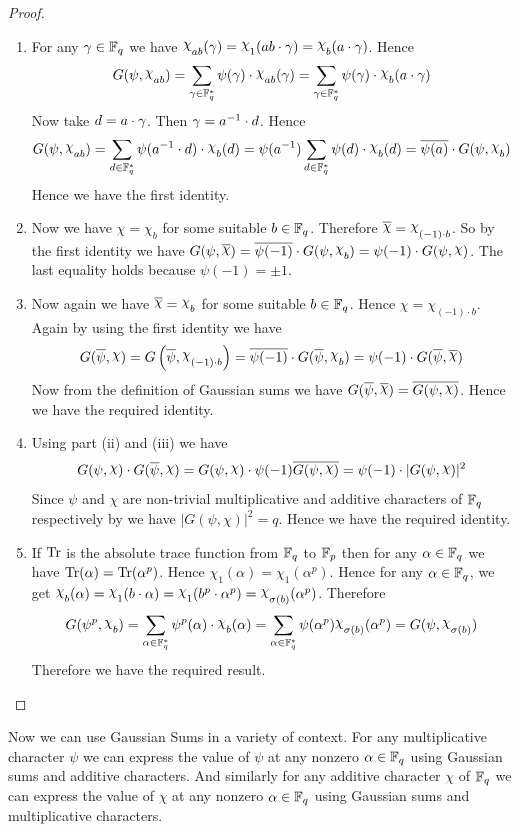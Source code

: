 \begin{proof}
  \begin{enumerate}[label=(\roman*)]
    \item For any $\gamma\in\mathbb{F}_q$ we have $\chi_{ab}(\gm)=\chi_1(ab\cdot \gm)=\chi_b(a\cdot \gm)$. Hence $$G(\psi,\chi_{ab})=\sum_{\gm\in\bbF_q^*}\psi(\gm)\cdot \chi_{ab}(\gm)=\sum_{\gm\in\bbF_q^*}\psi(\gm)\cdot \chi_b(a\cdot \gm)$$Now take $d=a\cdot \gamma$. Then $\gamma=a^{-1}\cdot d$. Hence $$G(\psi,\chi_{ab})=\sum_{d\in\bbF_q^*}\psi(a^{-1}\cdot d)\cdot \chi_b(d)=\psi(a^{-1})\sum_{d\in\bbF_q^*}\psi(d)\cdot \chi_b(d)=\ov{\psi(a)}\cdot G(\psi,\chi_b)$$Hence we have the first identity.
    \item Now we have $\chi=\chi_b$ for some suitable $b\in \mathbb{F}_q$. Therefore $\ov{\chi}=\chi_{(-1)\cdot b}$. So by the first identity we have $G(\psi,\ov{\chi})=\ov{\psi(-1)}\cdot G(\psi,\chi_b)=\psi(-1)\cdot G(\psi,\chi)$. The last equality holds because $\psi(-1)=\pm 1$.
    \item Now again we have $\ov{\chi}=\chi_b$ for some suitable $b\in \mathbb{F}_q$. Hence $\chi=\chi_{(-1)\cdot b}$. Again by using the first identity we have $$G(\ov{\psi},\chi)=G\lt(\ov{\psi},\chi_{(-1)\cdot b}\rt)=\ov{\psi(-1)}\cdot G(\ov{\psi},\chi_b)=\psi(-1)\cdot G(\ov{\psi},\ov{\chi})$$Now from the definition of Gaussian sums we have $G(\ov{\psi},\ov{\chi})=\ov{G(\psi,\chi)}$. Hence we have the required identity.
    \item Using part (ii) and (iii) we have $$G(\psi,\chi)\cdot G(\ov{\psi},\chi)=G(\psi,\chi)\cdot \psi(-1)\ov{G(\psi,\chi)}=\psi(-1)\cdot |G(\psi,\chi)|^2$$Since $\psi$ and $\chi$ are non-trivial multiplicative and additive characters of $\mathbb{F}_q$ respectively by  we have $|G(\psi,\chi)|^2=q$. Hence we have the required identity.
    \item If $\operatorname{Tr}$ is the absolute trace function from $\mathbb{F}_q$ to $\mathbb{F}_p$ then for any $\alpha\in\mathbb{F}_q$ we have $\operatorname{Tr}(\alpha)=\operatorname{Tr}(\alpha^p)$. Hence $\chi_1(\alpha)=\chi_1(\alpha^p)$. Hence for any $\alpha\in \mathbb{F}_q$, we get $\chi_b(\alpha)=\chi_1(b\cdot \alpha)=\chi_1(b^p\cdot \alpha^p)=\chi_{\sg(b)}(\alpha^p)$. Therefore $$G(\psi^p,\chi_b)=\sum_{\alpha\in\bbF_q^*}\psi^p(\alpha)\cdot \chi_b(\alpha)=\sum_{\alpha\in\bbF_q^*}\psi(\alpha^p)\chi_{\sg(b)}(\alpha^p)=G(\psi,\chi_{\sg(b)})$$Therefore  we have the required result.
  \end{enumerate}
\end{proof}

Now we can use Gaussian Sums in a variety of context. For any multiplicative character $\psi$ we can express the value of $\psi$ at any nonzero $\alpha\in\mathbb{F}_q$ using Gaussian sums and additive characters. And similarly for any additive character $\chi$ of $\mathbb{F}_q$ we can express the value of $\chi$ at any nonzero $\alpha\in\mathbb{F}_q$ using Gaussian sums and multiplicative characters.

